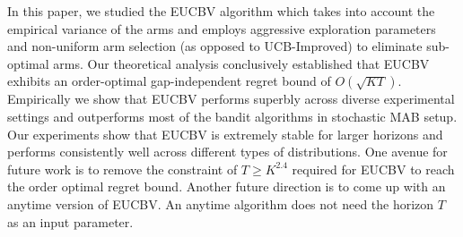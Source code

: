 In this paper, we studied the EUCBV algorithm which takes into account the empirical variance of the arms and employs aggressive exploration parameters and non-uniform arm selection (as opposed to UCB-Improved) to eliminate sub-optimal arms. Our theoretical analysis conclusively established that EUCBV exhibits an order-optimal gap-independent regret bound of $O\left(\sqrt{KT}\right)$. Empirically we show that EUCBV performs superbly across diverse experimental settings and outperforms most of the bandit algorithms in stochastic  MAB setup. Our experiments show that EUCBV is extremely stable for larger horizons and performs consistently well across different types of distributions. One avenue for future work is to remove the constraint of $T\geq K^{2.4}$ required for EUCBV to reach the order optimal regret bound. Another future direction is to come up with an anytime version of EUCBV. An anytime algorithm does not need the horizon $T$ as an input parameter.


